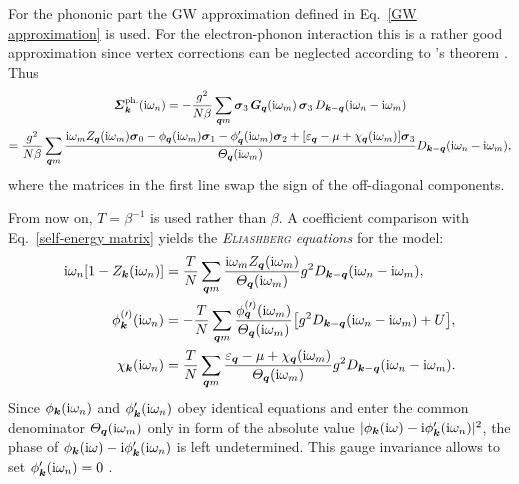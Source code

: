 For the phononic part the GW approximation defined in Eq.~\ref{GW approximation}
is used. For the electron-phonon interaction this is a rather good approximation
since vertex corrections can be neglected according to 's theorem
\cite{Migdal58}. Thus
%
\begin{multline*}
    \boldsymbol {\varSigma}_{\boldsymbol k} \sp{\text{ph.}} (\mathrm i \omega_n)
    = -\frac{g^2}{N \beta} \sum_{\boldsymbol q m}
    \boldsymbol \sigma_3 \, \boldsymbol G_{\boldsymbol q}(\mathrm i \omega_m) \, \boldsymbol \sigma_3 \,
    D_{\boldsymbol k - \boldsymbol q}(\mathrm i \omega_n - \mathrm i \omega_m)
    \\
    = \frac{g^2}{N \beta} \sum_{\boldsymbol q m}
    \frac { \mathrm i \omega_m
              Z_{\boldsymbol q}(\mathrm i \omega_m) \boldsymbol \sigma_0
        - \phi _{\boldsymbol q}(\mathrm i \omega_m) \boldsymbol \sigma_1
        - \phi'_{\boldsymbol q}(\mathrm i \omega_m) \boldsymbol \sigma_2
        + [\varepsilon_{\boldsymbol q} - \mu + \chi_{\boldsymbol q}(\mathrm i \omega_m)] \boldsymbol \sigma_3 }
        {\varTheta_{\boldsymbol q}(\mathrm i \omega_m)}
    D_{\boldsymbol k - \boldsymbol q}(\mathrm i \omega_n - \mathrm i \omega_m),
\end{multline*}
%
where the  matrices in the first line swap the sign of the
off-diagonal components.

From now on, $T = \beta^{-1}$ is used rather than $\beta$. A coefficient
comparison with Eq.~\ref{self-energy matrix} yields the
\emph{\textsc{Eliashberg} equations} \cite{Eliashberg60} for the
 model:
%
\begin{subequations}
    \begin{align}
        \mathrm i \omega_n [1 - Z_{\boldsymbol k}(\mathrm i \omega_n)] &= \frac T N
        \sum_{\boldsymbol q m} \frac
            {\mathrm i \omega_m Z_{\boldsymbol q}(\mathrm i \omega_m)}
            {\varTheta_{\boldsymbol q}(\mathrm i \omega_m)}
        g^2 D_{\boldsymbol k - \boldsymbol q}(\mathrm i \omega_n - \mathrm i \omega_m),
        \\
        \phi^{(\prime)}_{\boldsymbol k}(\mathrm i \omega_n) &= -\frac T N
        \sum_{\boldsymbol q m} \frac
            {\phi^{(\prime)}_{\boldsymbol q}(\mathrm i \omega_m)}
            {\varTheta_{\boldsymbol q}(\mathrm i \omega_m)}
        \big[ g^2 D_{\boldsymbol k - \boldsymbol q}(\mathrm i \omega_n - \mathrm i \omega_m) + U \big],
        \\
        \chi_{\boldsymbol k}(\mathrm i \omega_n) &= \frac T N
        \sum_{\boldsymbol q m} \frac
            {\varepsilon_{\boldsymbol q} - \mu + \chi_{\boldsymbol q}(\mathrm i \omega_m)}
            {\varTheta_{\boldsymbol q}(\mathrm i \omega_m)}
        g^2 D_{\boldsymbol k - \boldsymbol q}(\mathrm i \omega_n - \mathrm i \omega_m).
    \end{align}
\end{subequations}
%
Since $\phi_{\boldsymbol k}(\mathrm i \omega_n)$ and $\phi'_{\boldsymbol k}(\mathrm i \omega_n)$ obey
identical equations and enter the common denominator $\varTheta_{\boldsymbol q}(\mathrm i
\omega_m)$ only in form of the absolute value $|\phi_{\boldsymbol k}(\mathrm i \omega) - \mathrm i
\phi'_{\boldsymbol k}(\mathrm i \omega_n)|^2$, the phase of $\phi_{\boldsymbol k}(\mathrm i \omega) - \mathrm i
\phi'_{\boldsymbol k}(\mathrm i \omega_n)$ is left undetermined. This gauge invariance allows
to set $\phi'_{\boldsymbol k}(\mathrm i \omega_n) = 0$ \cites[37]{AllenMitrovic82}[around
Eq.~2.20]{Nambu60}.

